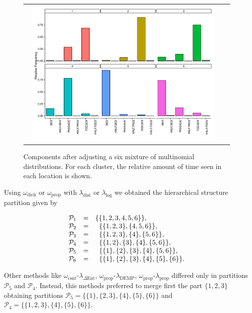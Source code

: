 \documentclass[submit]{smj}
\theoremstyle{definition}
\begin{document}
\begin{figure}[!t]
\begin{center}
\begin{tabular}{cc}
  \includegraphics[width=0.95\textwidth]{figures/multinomial_mixt_all.pdf} \\
 \end{tabular}
 \caption{Components after adjusting a six mixture of multinomial distributions. For each cluster, the relative amount of time seen in each location is shown.}\label{multinomial_mixture}
\end{center}
\end{figure}

Using $\omega_{\text{dich}}$ or  $\omega_{\text{prop}}$ with $\lambda_{\text{dist}}$ or $\lambda_{\log}$ we obtained the hierarchical structure partition given by


\begin{equation}
\begin{array}{r c l}
 \mathcal{P}_1&=& \{\{1,2,3,4,5,6\}\}, \\ 
 \mathcal{P}_2&=& \;\; \{\{1,2,3\},\{4,5,6\}\}, \\ 
 \mathcal{P}_3&=& \;\; \{\{1,2,3\},\{4\},\{5,6\}\}, \\ 
 \mathcal{P}_4&=& \;\; \{\{1,2\},\{3\},\{4\},\{5,6\}\}, \\ 
 \mathcal{P}_5&=& \;\; \{\{1\},\{2\},\{3\},\{4\},\{5,6\}\}, \\ 
 \mathcal{P}_6&=& \;\; \{\{1\},\{2\},\{3\},\{4\},\{5\},\{6\}\}.
\end{array}
\label{hier_ex_multinomial}
\end{equation}

Other methods like $\omega_{\text{csnt}}$-$\lambda_{\Delta\text{Ent}}$,  $\omega_{\text{prop}}$-$\lambda_{\text{DEMP}}$,  $\omega_{\text{prop}}$-$\lambda_{\text{prop}}$ differed only in partitions $\mathcal{P}_5$ and $\mathcal{P}_4$.  Instead, this methods preferred to merge first the part $\{1,2,3\}$ obtaining partitions $\mathcal{P}_5 = \{\{1\},\{2, 3\},\{4\},\{5\} ,\{6\}\}$ and $\mathcal{P}_4 = \{\{1,2,3\},\{4\},\{5\},\{6\}\}$.
\end{document}
